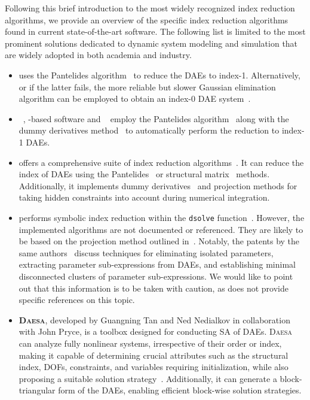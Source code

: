 Following this brief introduction to the most widely recognized index reduction algorithms, we provide an overview of the specific index reduction algorithms found in current state-of-the-art software. The following list is limited to the most prominent solutions dedicated to dynamic system modeling and simulation that are widely adopted in both academia and industry.
%
\begin{itemize}
  \setlength{\itemsep}{0.0em}
  \item \textbf{\Matlab{}} uses the Pantelides algorithm~\cite{pantelides1988consistent} to reduce the \acp{DAE} to index-1. Alternatively, or if the latter fails, the more reliable but slower Gaussian elimination algorithm can be employed to obtain an index-0 \ac{DAE} system~\cite{matlab}.
  \item \textbf{\Modelica{}}~\cite{mattsson1997modelica, mattsson1998physical}, \Modelica{}-based software and \textbf{\ModelingToolkit{}}~\cite{modelingtoolkit} employ the Pantelides algorithm~\cite{pantelides1988consistent} along with the dummy derivatives method~\cite{mattsson1993index} to automatically perform the reduction to index-1 \acp{DAE}.
  \item \textbf{\Mathematica{}} offers a comprehensive suite of index reduction algorithms~\cite{mathematica}. It can reduce the index of \acp{DAE} using the Pantelides~\cite{pantelides1988consistent} or structural matrix~ \cite{unger1995structural, chowdhry2004symbolic} methods. Additionally, it implements dummy derivatives~\cite{mattsson1993index} and projection methods for taking hidden constraints into account during numerical integration.
  \item \textbf{\Maple{}} performs symbolic index reduction within the \texttt{dsolve} function~\cite{maple}. However, the implemented algorithms are not documented or referenced. They are likely to be based on the projection method outlined in~\cite{shmoylova2013simplification}. Notably, the patents by the same authors~\cite{postma2012exact, shmoylova2012method, postma2015exact} discuss techniques for eliminating isolated parameters, extracting parameter sub-expressions from \acp{DAE}, and establishing minimal disconnected clusters of parameter sub-expressions. We would like to point out that this information is to be taken with caution, as \Maple{} does not provide specific references on this topic.
  \item \textbf{\textsc{Daesa}}, developed by Guangning Tan and Ned Nedialkov in collaboration with John Pryce, is a \Matlab{} toolbox designed for conducting \ac{SA} of \acp{DAE}. \textsc{Daesa} can analyze fully nonlinear systems, irrespective of their order or index, making it capable of determining crucial attributes such as the structural index, \acp{DOF}, constraints, and variables requiring initialization, while also proposing a suitable solution strategy~\cite{nedialkov2015algorithm, tan2016symbolic}. Additionally, it can generate a block-triangular form of the \acp{DAE}, enabling efficient block-wise solution strategies.

\end{itemize}

